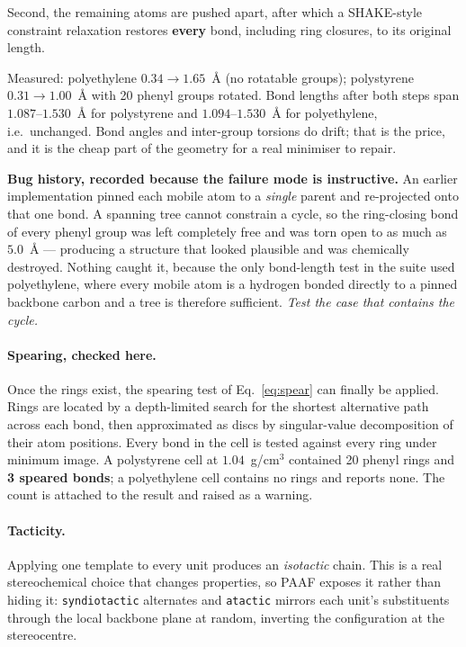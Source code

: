 \documentclass[11pt,a4paper]{article}
\begin{document}
Second, the remaining atoms are pushed apart, after which a SHAKE-style
constraint relaxation restores \textbf{every} bond, including ring closures,
to its original length.

Measured: polyethylene $0.34 \rightarrow 1.65$~\AA{} (no rotatable groups);
polystyrene $0.31 \rightarrow 1.00$~\AA{} with 20 phenyl groups rotated. Bond
lengths after both steps span $1.087$--$1.530$~\AA{} for polystyrene and
$1.094$--$1.530$~\AA{} for polyethylene, i.e.\ unchanged. Bond angles and
inter-group torsions do drift; that is the price, and it is the cheap part of
the geometry for a real minimiser to repair.

\begin{caveat}
\textbf{Bug history, recorded because the failure mode is instructive.}
An earlier implementation pinned each mobile atom to a \emph{single} parent
and re-projected onto that one bond. A spanning tree cannot constrain a cycle,
so the ring-closing bond of every phenyl group was left completely free and
was torn open to as much as $5.0$~\AA{} --- producing a structure that looked
plausible and was chemically destroyed. Nothing caught it, because the only
bond-length test in the suite used polyethylene, where every mobile atom is a
hydrogen bonded directly to a pinned backbone carbon and a tree is therefore
sufficient. \emph{Test the case that contains the cycle.}
\end{caveat}

\paragraph{Spearing, checked here.} Once the rings exist, the spearing test of
Eq.~\eqref{eq:spear} can finally be applied. Rings are located by a
depth-limited search for the shortest alternative path across each bond, then
approximated as discs by singular-value decomposition of their atom positions.
Every bond in the cell is tested against every ring under minimum image. A
polystyrene cell at $1.04$~g/cm$^3$ contained 20 phenyl rings and \textbf{3
speared bonds}; a polyethylene cell contains no rings and reports none. The
count is attached to the result and raised as a warning.

\paragraph{Tacticity.} Applying one template to every unit produces an
\emph{isotactic} chain. This is a real stereochemical choice that changes
properties, so PAAF exposes it rather than hiding it: \texttt{syndiotactic}
alternates and \texttt{atactic} mirrors each unit's substituents through the
local backbone plane at random, inverting the configuration at the
stereocentre.
\end{document}

